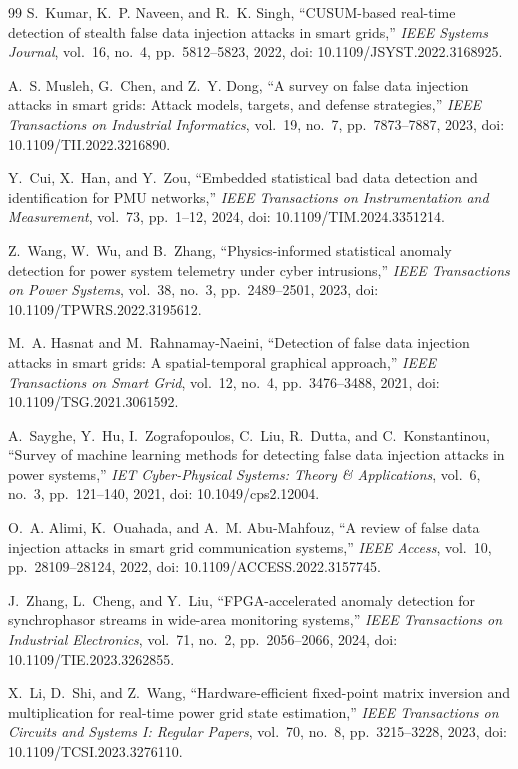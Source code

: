 \documentclass[12pt,a4paper]{report}
\begin{document}
\begin{thebibliography}{99}
S.~Kumar, K.~P. Naveen, and R.~K. Singh,
``CUSUM-based real-time detection of stealth false data injection attacks in smart grids,''
\textit{IEEE Systems Journal},
vol.~16, no.~4, pp.~5812--5823, 2022, doi: 10.1109/JSYST.2022.3168925.

A.~S. Musleh, G.~Chen, and Z.~Y. Dong,
``A survey on false data injection attacks in smart grids: Attack models, targets, and defense strategies,''
\textit{IEEE Transactions on Industrial Informatics},
vol.~19, no.~7, pp.~7873--7887, 2023, doi: 10.1109/TII.2022.3216890.

Y.~Cui, X.~Han, and Y.~Zou,
``Embedded statistical bad data detection and identification for PMU networks,''
\textit{IEEE Transactions on Instrumentation and Measurement},
vol.~73, pp.~1--12, 2024, doi: 10.1109/TIM.2024.3351214.

Z.~Wang, W.~Wu, and B.~Zhang,
``Physics-informed statistical anomaly detection for power system telemetry under cyber intrusions,''
\textit{IEEE Transactions on Power Systems},
vol.~38, no.~3, pp.~2489--2501, 2023, doi: 10.1109/TPWRS.2022.3195612.

M.~A. Hasnat and M.~Rahnamay-Naeini,
``Detection of false data injection attacks in smart grids: A spatial-temporal graphical approach,''
\textit{IEEE Transactions on Smart Grid},
vol.~12, no.~4, pp.~3476--3488, 2021, doi: 10.1109/TSG.2021.3061592.

A.~Sayghe, Y.~Hu, I.~Zografopoulos, C.~Liu, R.~Dutta, and C.~Konstantinou,
``Survey of machine learning methods for detecting false data injection attacks in power systems,''
\textit{IET Cyber-Physical Systems: Theory \& Applications},
vol.~6, no.~3, pp.~121--140, 2021, doi: 10.1049/cps2.12004.

O.~A. Alimi, K.~Ouahada, and A.~M. Abu-Mahfouz,
``A review of false data injection attacks in smart grid communication systems,''
\textit{IEEE Access},
vol.~10, pp.~28109--28124, 2022, doi: 10.1109/ACCESS.2022.3157745.

J.~Zhang, L.~Cheng, and Y.~Liu,
``FPGA-accelerated anomaly detection for synchrophasor streams in wide-area monitoring systems,''
\textit{IEEE Transactions on Industrial Electronics},
vol.~71, no.~2, pp.~2056--2066, 2024, doi: 10.1109/TIE.2023.3262855.

X.~Li, D.~Shi, and Z.~Wang,
``Hardware-efficient fixed-point matrix inversion and multiplication for real-time power grid state estimation,''
\textit{IEEE Transactions on Circuits and Systems I: Regular Papers},
vol.~70, no.~8, pp.~3215--3228, 2023, doi: 10.1109/TCSI.2023.3276110.


\end{thebibliography}
\end{document}
